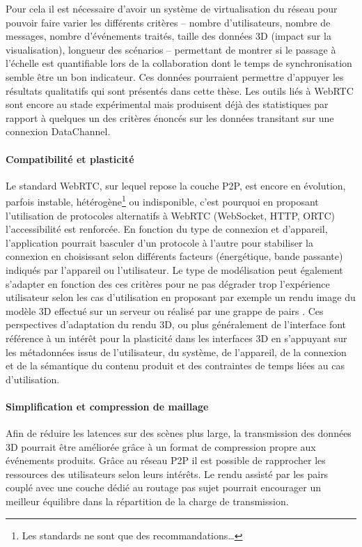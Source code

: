 Pour cela il est nécessaire d'avoir un système de virtualisation du réseau pour 
pouvoir faire varier les différents critères -- nombre 
d'utilisateurs, nombre de messages, nombre d'événements traités, taille des 
données 3D (impact sur la visualisation), longueur des scénarios -- permettant de 
montrer si le passage à l'échelle est quantifiable lors de la collaboration dont le 
temps de synchronisation semble être un bon indicateur. Ces données pourraient 
permettre d'appuyer les résultats qualitatifs qui sont présentés dans cette thèse. 
Les outils liés à WebRTC sont encore au stade expérimental mais produisent déjà 
des statistiques par rapport à quelques un des critères énoncés sur les données 
transitant sur une connexion DataChannel.

\paragraph{Compatibilité et plasticité}
Le standard WebRTC, sur lequel repose la couche \gls{P2P}, est encore en 
évolution, parfois instable, hétérogène\footnote{Les standards ne sont que des 
recommandations\dots} ou indisponible, c'est pourquoi en proposant l'utilisation 
de protocoles alternatifs à WebRTC (WebSocket, HTTP, ORTC) l'accessibilité est 
renforcée. En fonction du type de connexion et d'appareil, l'application pourrait 
basculer d'un protocole à l'autre pour stabiliser la connexion en choisissant selon 
différents facteurs (énergétique, bande passante) indiqués par l'appareil ou 
l'utilisateur. 
Le type de modélisation peut également s'adapter en fonction des ces critères  
pour ne pas dégrader trop l'expérience utilisateur selon les cas d'utilisation en 
proposant par exemple un rendu image du modèle 3D effectué sur un serveur 
\cite{Abdallah2014} ou réalisé par une grappe de pairs \cite{Li2015}.
Ces perspectives d'adaptation du rendu 3D, ou plus généralement de l'interface 
font référence à un intérêt pour la plasticité dans les interfaces 3D 
\cite{Lacoche2014} en s'appuyant sur les métadonnées issus de l'utilisateur, du 
système, de l'appareil, de la connexion et de la sémantique du contenu produit et 
des contraintes de temps liées au cas d'utilisation.



\paragraph{Simplification et compression de maillage}
Afin de réduire les latences sur des scènes plus large, la transmission des 
données 3D pourrait être améliorée grâce à un format de 
compression propre aux événements produits. Grâce au 
réseau \gls{P2P} il est possible de rapprocher les ressources des utilisateurs 
selon leurs intérêts. Le rendu assisté par les pairs \cite{Zhu2011} couplé avec une 
couche dédié au routage pas sujet \cite{Baldoni2007} pourrait encourager un 
meilleur équilibre dans la répartition de la charge de transmission.

